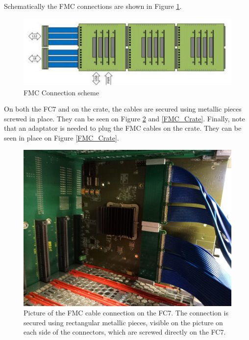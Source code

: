 \documentclass[10pt,a4paper]{article}
\begin{document}
Schematically the FMC connections are shown in Figure \ref{FMCConnection}.
\begin{figure}[h!]
 \includegraphics[width=\linewidth]{FMCScheme.png} 
  \caption{FMC Connection scheme}
  \label{FMCConnection}
\end{figure}

On both the FC7 and on the crate, the cables are secured using metallic pieces screwed in place. They can be seen on Figure \ref{FMC_FC7} and \ref{FMC_Crate}. Finally, note that an adaptator is needed to plug the FMC cables on the crate. They can be seen in place on Figure \ref{FMC_Crate}.

\begin{figure}[h!]
\centering
 \includegraphics[width=0.6\linewidth]{FMC_FC7.jpeg} 
  \caption{Picture of the FMC cable connection on the FC7. The connection is secured using rectangular metallic pieces, visible on the picture on each side of the connectors, which are screwed directly on the FC7.}
  \label{FMC_FC7}
\end{figure}
\end{document}
